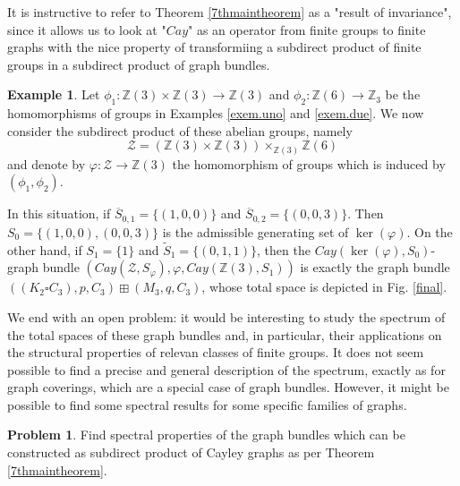 \documentclass{amsart}
\theoremstyle{definition}
\newtheorem{example}[theo]{Example}
\newtheorem{problem}[theo]{Problem}
\numberwithin{equation}{section}
\begin{document}
It is instructive to refer to Theorem \ref{7thmaintheorem} as a "result of invariance", since it allows us to look at "$Cay$" as an operator from finite groups to finite graphs with the nice property of transformiing a subdirect product of finite groups in a subdirect product of graph bundles. 

\begin{example}\label{last}
 Let $\phi_1: \mathbb{Z}(3) \times \mathbb{Z}(3) \longrightarrow \mathbb{Z}(3)$ and $\phi_2: \mathbb{Z}(6) \longrightarrow \mathbb{Z}_3$ be the homomorphisms of groups in Examples \ref{exem.uno} and \ref{exem.due}. We now consider the subdirect product of these abelian groups, namely \begin{equation}
 \mathcal{Z} = (\mathbb{Z}(3) \times \mathbb{Z}(3))\times_{\mathbb{Z}(3)} \mathbb{Z}(6)\end{equation}  and denote by $\varphi: \mathcal{Z} \longrightarrow  \mathbb{Z}(3)$  the homomorphism of groups which is induced by $(\phi_1, \phi_2)$.
 
 In this situation, if  $\overline{S}_{0,1} = \{(1,0,0)\}$ and $\overline{S}_{0,2} = \{(0,0,3)\}$. Then $S_0= \{(1,0,0), (0,0,3)\}$ is the admissible generating set of $\ker(\varphi)$. On the other hand, if $S_1 = \{1\}$ and  $\widetilde{S}_1 = \{(0,1,1)\}$,  then  the $Cay(\ker(\varphi), S_0)$-graph bundle $(Cay(\mathcal{Z}, S_{\varphi}), \varphi, Cay(\mathbb{Z}(3), S_1))$ is exactly the graph bundle $((K_2 \square C_3), p, C_3) \boxplus (M_3, q, C_3)$, whose total space is depicted in Fig. \ref{final}.
\end{example}

We end with an open problem: it would be interesting to study the spectrum of the total spaces of these graph bundles and, in particular, their applications on the structural properties of relevan classes of finite groups. It does not seem possible to find a precise and general description of the spectrum, exactly as for graph coverings, which are a special case of graph bundles. However, it might be possible to find some spectral results for some specific families of graphs.

\begin{problem} Find  spectral properties of the graph bundles which can be constructed as subdirect product of Cayley graphs as per Theorem \ref{7thmaintheorem}.    
\end{problem}
\end{document}
